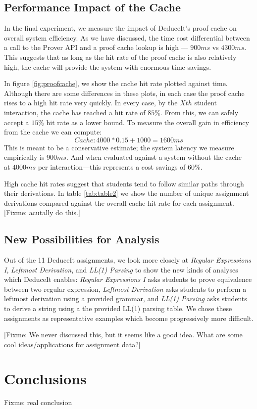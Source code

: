 \documentclass{sigchi}
\begin{document}
\subsection{Performance Impact of the Cache}

In the final experiment, we measure the impact of DeduceIt's proof cache on overall system efficiency. As we have discussed, the time cost differential between a call to the Prover API and a proof cache lookup is high --- $900ms$ vs $4300ms$. This suggests that as long as the hit rate of the proof cache is also relatively high, the cache will provide the system with enormous time savings. 

In figure \ref{fig:proofcache}, we show the cache hit rate plotted against time. Although there are some differences in these plots, in each case the proof cache rises to a high hit rate very quickly. In every case, by the $Xth$ student interaction, the cache has reached a hit rate of $85\%$. From this, we can safely accept a $15\%$ hit rate as a lower bound. To measure the overall gain in efficiency from the cache we can compute:
$$Cache: 4000*0.15 + 1000 = 1600ms$$
This is meant to be a conservative estimate; the system latency we measure empirically is $900ms$. And when evaluated against a system without the cache---at $4000ms$ per interaction---this represents a cost savings of $60\%$.

High cache hit rates suggest that students tend to follow similar paths through their derivations. In table \ref{tab:table2} we show the number of unique assignment derivations compared against the overall cache hit rate for each assignment. [Fixme: acutally do this.]

\subsection{New Possibilities for Analysis}

Out of the 11 DeduceIt assignments, we look more closely at \textit{Regular Expressions I}, \textit{Leftmost Derivation}, and \textit{LL(1) Parsing} to show the new kinds of analyses which DeduceIt enables: \textit{Regular Expressions I} asks students to prove equivalence between two regular expression, \textit{Leftmost Derivation} asks students to perform a leftmost derivation using a provided grammar, and \textit{LL(1) Parsing} asks students to derive a string using a the provided LL(1) parsing table. We chose these assignments as representative examples which become progressively more difficult.

[Fixme: We never discussed this, but it seems like a good idea. What are some cool ideas/applications for assignment data?]

\section{Conclusions}

Fixme: real conclusion

\balance



\end{document}
